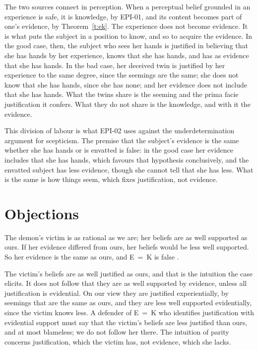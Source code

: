 \documentclass{situationist-preprint}
\begin{document}
The two sources connect in perception. When a perceptual belief grounded in an experience is safe, it is knowledge, by EPI-01, and its content becomes part of one's evidence, by Theorem~\ref{t:ek}. The experience does not become evidence. It is what puts the subject in a position to know, and so to acquire the evidence. In the good case, then, the subject who sees her hands is justified in believing that she has hands by her experience, knows that she has hands, and has as evidence that she has hands. In the bad case, her deceived twin is justified by her experience to the same degree, since the seemings are the same; she does not know that she has hands, since she has none; and her evidence does not include that she has hands. What the twins share is the seeming and the prima facie justification it confers. What they do not share is the knowledge, and with it the evidence.

This division of labour is what EPI-02 uses against the underdetermination argument for scepticism. The premise that the subject's evidence is the same whether she has hands or is envatted is false: in the good case her evidence includes that she has hands, which favours that hypothesis conclusively, and the envatted subject has less evidence, though she cannot tell that she has less. What is the same is how things seem, which fixes justification, not evidence.

\section{Objections}

\begin{objection}
The demon's victim is as rational as we are; her beliefs are as well supported as ours. If her evidence differed from ours, her beliefs would be less well supported. So her evidence is the same as ours, and E~=~K is false \citep{Cohen1984,Silins2005}.
\end{objection}

\begin{reply}
The victim's beliefs are as well justified as ours, and that is the intuition the case elicits. It does not follow that they are as well supported by evidence, unless all justification is evidential. On our view they are justified experientially, by seemings that are the same as ours, and they are less well supported evidentially, since the victim knows less. A defender of E~=~K who identifies justification with evidential support must say that the victim's beliefs are less justified than ours, and at most blameless; we do not follow her there. The intuition of parity concerns justification, which the victim has, not evidence, which she lacks.
\end{reply}
\end{document}
